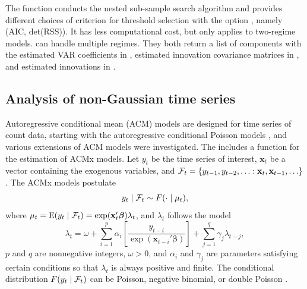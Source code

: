 

The function  conducts the nested sub-sample search algorithm and provides different choices of criterion for threshold selection with the option , namely (AIC, det(RSS)). It has less computational cost, but only applies to two-regime models.  can handle multiple regimes. They both return a list of components with the estimated VAR coefficients in , estimated innovation covariance matrices in , and estimated innovations in .


\subsection{Analysis of non-Gaussian time series}
Autoregressive conditional mean (ACM) models are designed for time series of count data, starting with the autoregressive conditional Poisson models \citep{heinen2003}, and various extensions of ACM models were investigated. The  includes a function  for the estimation of ACMx models. Let $y_t$ be the time series of interest, $\mathbf{x}_t$ be a vector containing the exogenous variables, and ${\cal{F}}_t=\{ y_{t-1},y_{t-2},\ldots: \mathbf{x}_t, \mathbf{x}_{t-1},\ldots \}$. The ACMx models postulate
\[
y_t\mid {\cal F}_t \sim F(\cdot \mid \mu_t),
\]
where $\mu_t={\rm E}(y_t \mid {\cal F}_t)= \exp ({\mathbf x}_t' {\boldsymbol{\beta}})\lambda_t$,
and $\lambda_t$ follows the model
\[
\lambda_t=\omega+\sum_{i=1}^p \alpha_i\left[ \frac{y_{t-i}}{\exp(\mathbf{x}_{t-i}' \boldsymbol{\beta})}\right] +\sum_{j=1}^q \gamma_j \lambda_{t-j},
\]
$p$ and $q$ are nonnegative integers, $\omega>0$, and $\alpha_i$ and $\gamma_j$ are parameters satisfying certain conditions so that $\lambda_t$ is always positive and finite. The conditional distribution $F(y_t\mid {\cal F}_t)$ can be Poisson, negative binomial, or double Poisson \citep{tsay2018}.

